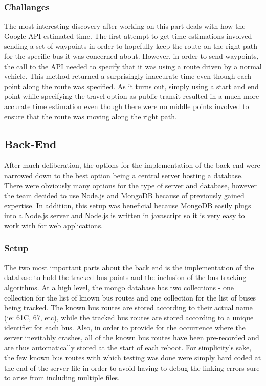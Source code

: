 \documentclass[pageno]{jpaper}
\begin{document}
\subsubsection{Challanges}
The most interesting discovery after working on this part deals with how the 
Google API estimated time. The first attempt to get time estimations involved sending a 
set of waypoints in order to hopefully keep the route on the right path for the specific 
bus it was concerned about. However, in order to send waypoints, the call to the API 
needed to specify that it was using a route driven by a normal vehicle. This method 
returned a surprisingly inaccurate time even though each point along the route was 
specified. As it turns out, simply using a start and end point while specifying the travel 
option as public transit resulted in a much more accurate time estimation even though 
there were no middle points involved to ensure that the route was moving along the 
right path.

\subsection{Back-End}

After much deliberation, the options for the implementation of the back end were 
narrowed down to the best option being a central server hosting a database. There 
were obviously many options for the type of server and database, however the team 
decided to use Node.js and MongoDB because of previously gained expertise. In 
addition, this setup was beneficial because MongoDB easily plugs into a Node.js server 
and Node.js is written in javascript so it is very easy to work with for web applications.

\subsubsection{Setup}
The two most important parts about the back end is the implementation of the
database to hold the tracked bus points and the inclusion of the bus tracking algorithms. 
At a high level, the mongo database has two collections - one collection for the list of 
known bus routes and one collection for the list of buses being tracked. The known bus 
routes are stored according to their actual name (ie: 61C, 67, etc), while the tracked bus 
routes are stored according to a unique identifier for each bus. Also, in order to provide 
for the occurrence where the server inevitably crashes, all of the known bus routes have 
been pre-recorded and are thus automatically stored at the start of each reboot. For 
simplicity’s sake, the few known bus routes with which testing was done were simply 
hard coded at the end of the server file in order to avoid having to debug the linking 
errors sure to arise from including multiple files.
\end{document}
